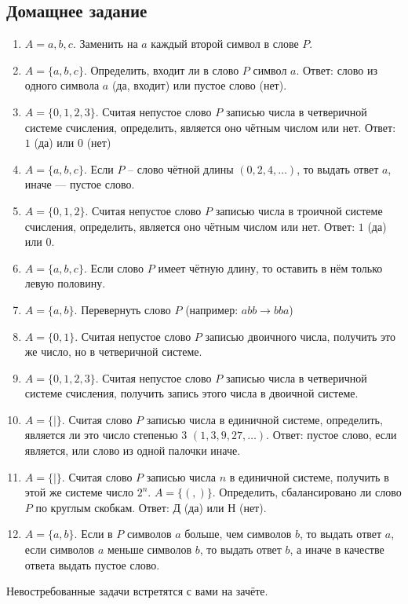 \subsection*{Домащнее задание}
\begin{enumerate}
    \item $A={a,b,c}$. Заменить на $a$ каждый второй символ в слове $P$.
    \item $A=\{a,b,c\}$. Определить, входит ли в слово $P$ символ $a$. Ответ: слово из
    одного символа $a$ (да, входит) или пустое слово (нет).
    \item $A=\{0,1,2,3\}$. Считая непустое слово $P$ записью числа в четверичной
    системе счисления, определить, является оно чётным числом или нет. Ответ: $1$
    (да) или $0$ (нет)
    \item $A=\{a,b,c\}$. Если $P$ – слово чётной длины $(0, 2, 4, \dots)$, то выдать ответ $a$,
    иначе --- пустое слово.
    \item $A=\{0,1,2\}$. Считая непустое слово $P$ записью числа в троичной системе
    счисления, определить, является оно чётным числом или нет. Ответ: $1$ (да) или $0$.
    \item $A=\{a,b,c\}$. Если слово $P$ имеет чётную длину, то оставить в нём только
    левую половину.
    \item $A=\{a,b\}$. Перевернуть слово $P$ (например: $abb\to bba$)
    \item $A=\{0,1\}$. Считая непустое слово $P$ записью двоичного числа, получить это
    же число, но в четверичной системе.
    \item $A=\{0,1,2,3\}$. Считая непустое слово $P$ записью числа в четверичной
    системе счисления, получить запись этого числа в двоичной системе.
    \item $A=\{ | \}$. Считая слово $P$ записью числа в единичной системе, определить,
    является ли это число степенью $3$ $(1, 3, 9, 27, \dots)$. Ответ: пустое слово, если
    является, или слово из одной палочки иначе.
    \item $A=\{ | \}$. Считая слово $P$ записью числа $n$ в единичной системе, получить в
    этой же системе число $2^n$.
    $A=\{(, )\}$. Определить, сбалансировано ли слово $P$ по круглым скобкам.
    Ответ: Д (да) или Н (нет).
    \item $A=\{a,b\}$. Если в $P$ символов $a$ больше, чем символов $b$, то выдать ответ $a$,
    если символов $a$ меньше символов $b$, то выдать ответ $b$, а иначе в качестве
    ответа выдать пустое слово.
\end{enumerate}
Невостребованные задачи встретятся с вами на зачёте.